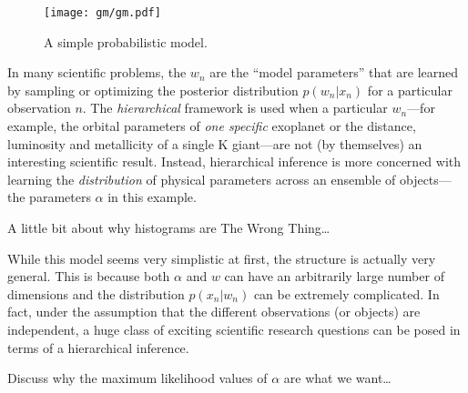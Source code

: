\documentclass[12pt,preprint]{aastex}
\newcommand{\figlabel}[1]{\label{fig:#1}}
\newcommand{\pr}[1]{p ( #1 )}
\begin{document}
\begin{figure}[htbp]
    \begin{center}
        \texttt{[image: gm/gm.pdf]}
    \end{center}
    \caption{A simple probabilistic model.\figlabel{gm-simple}}
\end{figure}

In many scientific problems, the $w_n$ are the ``model parameters'' that are
learned by sampling or optimizing the posterior distribution $\pr{w_n | x_n}$
for a particular observation $n$. The \emph{hierarchical} framework
is used when a particular $w_n$---for example, the orbital parameters of
\emph{one specific} exoplanet or the distance, luminosity and metallicity of
a single K giant---are not (by themselves) an interesting scientific result.
Instead, hierarchical inference is more concerned with learning the
\emph{distribution} of physical parameters across an ensemble of
objects---the parameters $\alpha$ in this example.

A little bit about why histograms are The Wrong Thing\ldots

While this model seems very simplistic at first, the structure is actually
very general. This is because both $\alpha$ and $w$ can have an arbitrarily
large number of dimensions and the distribution $\pr{x_n | w_n}$ can be
extremely complicated. In fact, under the assumption that the different
observations (or objects) are independent, a huge class of exciting
scientific research questions can be posed in terms of a hierarchical
inference.

Discuss why the maximum likelihood values of $\alpha$ are what we want\ldots
\end{document}
